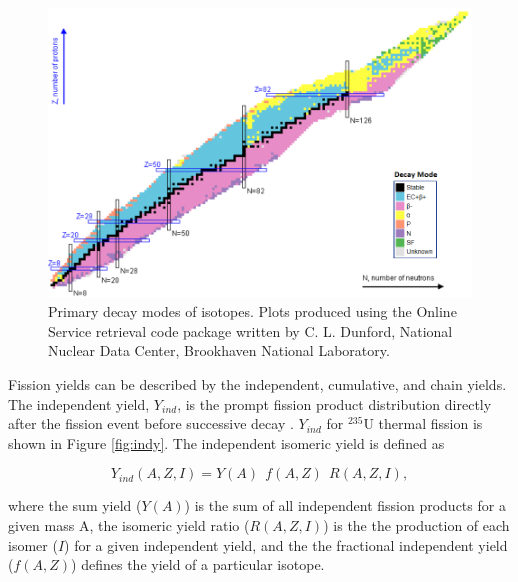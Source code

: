 \begin{figure}[htb!]
	\includegraphics[width=\linewidth]{Figures/Chapter2/DecayModes.png}
	\caption[Primary decay modes of isotopes.]{Primary decay modes of isotopes. Plots produced using the Online Service retrieval code package written by C. L. Dunford, National Nuclear Data Center, Brookhaven National Laboratory.}
	\label{fig:DMode}
\end{figure}

Fission yields can be described by the independent, cumulative, and chain yields. 
The independent yield, $Y_{ind}$, is the prompt fission product distribution directly after the fission event before successive decay \cite{Nichols2008}.
$Y_{ind}$ for $^{235}$U thermal fission is shown in Figure \ref{fig:indy}.
The independent isomeric yield is defined as \cite{indy}

\begin{equation} \label{eq:Indy}
Y_{ind}(A,Z,I) = Y(A) \ \ f(A,Z) \ \ R(A,Z,I), 
\end{equation}

\noindent where the sum yield ($Y(A)$) is the sum of all independent fission products for a given mass A, the isomeric yield ratio ($R(A,Z,I)$) is the the production of each isomer ($I$) for a given independent yield, and the the fractional independent yield ($f(A,Z)$) defines the yield of a particular isotope. 

